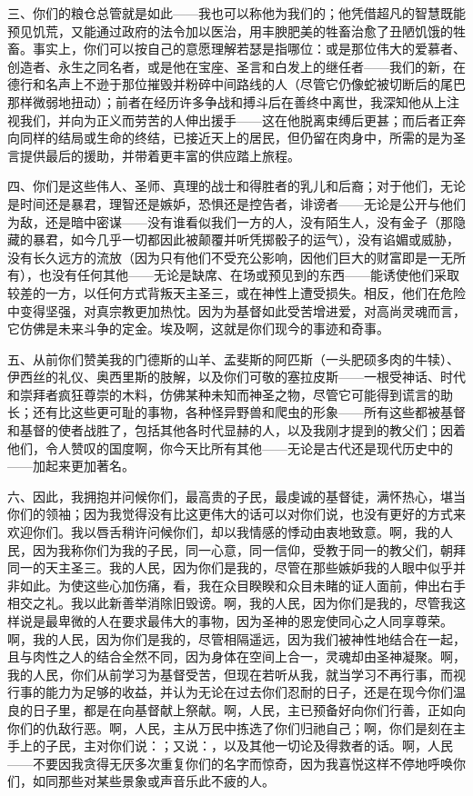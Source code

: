 三、你们的粮仓总管就是如此——我也可以称他为我们的；他凭借超凡的智慧既能预见饥荒，又能通过政府的法令加以医治，用丰腴肥美的牲畜治愈了丑陋饥饿的牲畜。事实上，你们可以按自己的意愿理解若瑟是指哪位：或是那位伟大的爱慕者、创造者、永生之同名者，或是他在宝座、圣言和白发上的继任者——我们的新，在德行和名声上不逊于那位摧毁并粉碎中间路线的人（尽管它仍像蛇被切断后的尾巴那样微弱地扭动）；前者在经历许多争战和搏斗后在善终中离世，我深知他从上注视我们，并向为正义而劳苦的人伸出援手——这在他脱离束缚后更甚；而后者正奔向同样的结局或生命的终结，已接近天上的居民，但仍留在肉身中，所需的是为圣言提供最后的援助，并带着更丰富的供应踏上旅程。\par

四、你们是这些伟人、圣师、真理的战士和得胜者的乳儿和后裔；对于他们，无论是时间还是暴君，理智还是嫉妒，恐惧还是控告者，诽谤者——无论是公开与他们为敌，还是暗中密谋——没有谁看似我们一方的人，没有陌生人，没有金子（那隐藏的暴君，如今几乎一切都因此被颠覆并听凭掷骰子的运气），没有谄媚或威胁，没有长久远方的流放（因为只有他们不受充公影响，因他们巨大的财富即是一无所有），也没有任何其他——无论是缺席、在场或预见到的东西——能诱使他们采取较差的一方，以任何方式背叛天主圣三，或在神性上遭受损失。相反，他们在危险中变得坚强，对真宗教更加热忱。因为为基督如此受苦增进爱，对高尚灵魂而言，它仿佛是未来斗争的定金。埃及啊，这就是你们现今的事迹和奇事。\par

五、从前你们赞美我的门德斯的山羊、孟斐斯的阿匹斯（一头肥硕多肉的牛犊）、伊西丝的礼仪、奥西里斯的肢解，以及你们可敬的塞拉皮斯——一根受神话、时代和崇拜者疯狂尊崇的木料，仿佛某种未知而神圣之物，尽管它可能得到谎言的助长；还有比这些更可耻的事物，各种怪异野兽和爬虫的形象——所有这些都被基督和基督的使者战胜了，包括其他各时代显赫的人，以及我刚才提到的教父们；因着他们，令人赞叹的国度啊，你今天比所有其他——无论是古代还是现代历史中的——加起来更加著名。\par

六、因此，我拥抱并问候你们，最高贵的子民，最虔诚的基督徒，满怀热心，堪当你们的领袖；因为我觉得没有比这更伟大的话可以对你们说，也没有更好的方式来欢迎你们。我以唇舌稍许问候你们，却以我情感的悸动由衷地致意。啊，我的人民，因为我称你们为我的子民，同一心意，同一信仰，受教于同一的教父们，朝拜同一的天主圣三。我的人民，因为你们是我的，尽管在那些嫉妒我的人眼中似乎并非如此。为使这些心加伤痛，看，我在众目睽睽和众目未睹的证人面前，伸出右手相交之礼。我以此新善举消除旧毁谤。啊，我的人民，因为你们是我的，尽管我这样说是最卑微的人在要求最伟大的事物，因为圣神的恩宠使同心之人同享尊荣。啊，我的人民，因为你们是我的，尽管相隔遥远，因为我们被神性地结合在一起，且与肉性之人的结合全然不同，因为身体在空间上合一，灵魂却由圣神凝聚。啊，我的人民，你们从前学习为基督受苦，但现在若听从我，就当学习不再行事，而视行事的能力为足够的收益，并认为无论在过去你们忍耐的日子，还是在现今你们温良的日子里，都是在向基督献上祭献。啊，人民，主已预备好向你们行善，正如向你们的仇敌行恶。啊，人民，主从万民中拣选了你们归祂自己；啊，你们是刻在主手上的子民，主对你们说：；又说：，以及其他一切论及得救者的话。啊，人民——不要因我贪得无厌多次重复你们的名字而惊奇，因为我喜悦这样不停地呼唤你们，如同那些对某些景象或声音乐此不疲的人。\par

